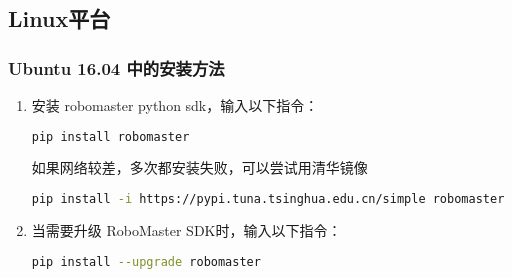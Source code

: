 \subsection{Linux平台}\label{sub_PyRM1_3}
\subsubsection{Ubuntu 16.04 中的安装方法}
\begin{enumerate}
\item 安装 robomaster python sdk，输入以下指令：

\begin{lstlisting}[language=bash]
pip install robomaster
\end{lstlisting}

如果网络较差，多次都安装失败，可以尝试用清华镜像

\begin{lstlisting}[language=bash]
pip install -i https://pypi.tuna.tsinghua.edu.cn/simple robomaster
\end{lstlisting}

\item 当需要升级 RoboMaster SDK时，输入以下指令：

\begin{lstlisting}[language=bash]
pip install --upgrade robomaster
\end{lstlisting}

\end{enumerate}
